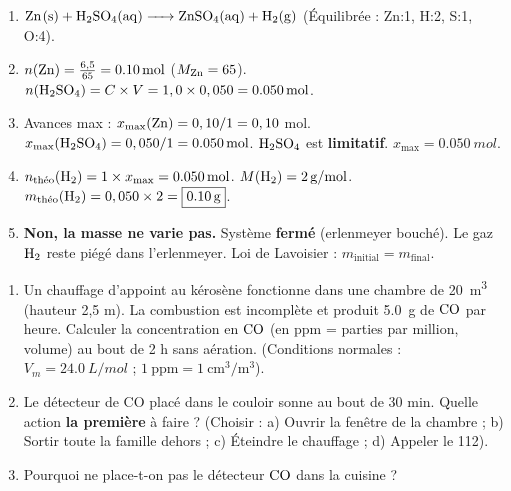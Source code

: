 \documentclass[11pt]{article}
\begin{document}
\begin{corrige}
\begin{enumerate}
    \item $\ce{Zn(s) + H2SO4(aq) -> ZnSO4(aq) + H2(g)}$ (Équilibrée : Zn:1, H:2, S:1, O:4).
    \item $n(\ce{Zn}) = \frac{6,5}{65} = \SI{0,10}{mol}$ ($M_{\ce{Zn}}=65$). $n(\ce{H2SO4}) = C \times V = 1,0 \times 0,050 = \SI{0,050}{mol}$.
    \item Avances max : $x_{\max}(\ce{Zn}) = 0,10/1 = 0,10$ mol. $x_{\max}(\ce{H2SO4}) = 0,050/1 = \SI{0,050}{mol}$.
    $\ce{H2SO4}$ est \textbf{limitatif}. $x_{\max} = \SI{0,050}{mol}$.
    \item $n_{\text{théo}}(\ce{H2}) = 1 \times x_{\max} = \SI{0,050}{mol}$. $M(\ce{H2}) = \SI{2}{g/mol}$.
    $m_{\text{théo}}(\ce{H2}) = 0,050 \times 2 = \boxed{\SI{0,10}{g}}$.
    \item \textbf{Non, la masse ne varie pas.} Système \textbf{fermé} (erlenmeyer bouché). Le gaz $\ce{H2}$ reste piégé dans l'erlenmeyer. Loi de Lavoisier : $m_{\text{initial}} = m_{\text{final}}$.
\end{enumerate}
\end{corrige}

\begin{exercice}
\begin{enumerate}
    \item Un chauffage d'appoint au kérosène fonctionne dans une chambre de \SI{20}{m^3} (hauteur 2,5 m). La combustion est incomplète et produit \SI{5,0}{g} de $\ce{CO}$ par heure. Calculer la concentration en $\ce{CO}$ (en ppm = parties par million, volume) au bout de 2 h sans aération. (Conditions normales : $V_m = \SI{24,0}{L/mol}$ ; $1~\text{ppm} = 1~\text{cm}^3/\text{m}^3$).
    \item Le détecteur de CO placé dans le couloir sonne au bout de 30 min. Quelle action \textbf{la première} à faire ? (Choisir : a) Ouvrir la fenêtre de la chambre ; b) Sortir toute la famille dehors ; c) Éteindre le chauffage ; d) Appeler le 112).
    \item Pourquoi ne place-t-on pas le détecteur $\ce{CO}$ dans la cuisine ?
\end{enumerate}
\end{exercice}
\end{document}
